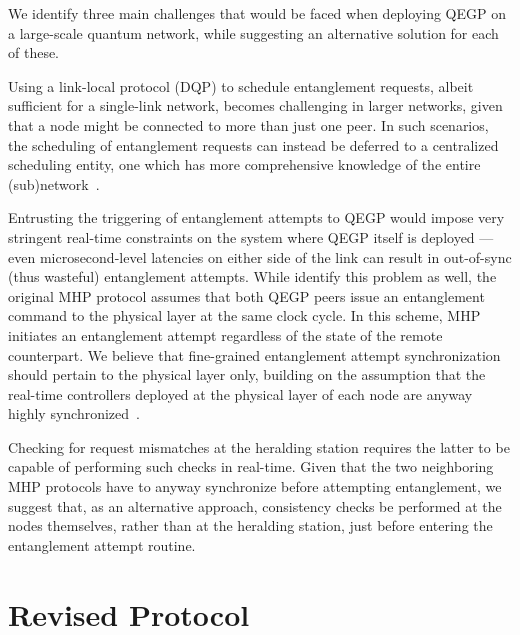 We identify three main challenges that would be faced when deploying QEGP on a large-scale quantum
network, while suggesting an alternative solution for each of these.
%
\begin{enumerate*}[label=(C\arabic*)]
    \item \label{enum:link_ch_queue} Using a link-local protocol (DQP) to schedule entanglement
          requests, albeit sufficient for a single-link network, becomes challenging in larger
          networks, given that a node might be connected to more than just one peer. In such
          scenarios, the scheduling of entanglement requests can instead be deferred to a
          centralized scheduling entity, one which has more comprehensive knowledge of the entire
          (sub)network~\cite{skrzypczyk_2021_arch}.
    \item \label{enum:link_ch_tsync} Entrusting the triggering of entanglement attempts to QEGP
          would impose very stringent real-time constraints on the system where QEGP itself is
          deployed --- even microsecond-level latencies on either side of the link can result in
          out-of-sync (thus wasteful) entanglement attempts. While \textcite{dahlberg_2019_egp}
          identify this problem as well, the original MHP protocol assumes that both QEGP peers
          issue an entanglement command to the physical layer at the same clock cycle. In this
          scheme, MHP initiates an entanglement attempt regardless of the state of the remote
          counterpart. We believe that fine-grained entanglement attempt synchronization should
          pertain to the physical layer only, building on the assumption that the real-time
          controllers deployed at the physical layer of each node are anyway highly
          synchronized~\cite{pompili_2021_multinode}.
    \item \label{enum:link_ch_mismatch} Checking for request mismatches at the heralding station
          requires the latter to be capable of performing such checks in real-time. Given that the
          two neighboring MHP protocols have to anyway synchronize before attempting entanglement,
          we suggest that, as an alternative approach, consistency checks be performed at the nodes
          themselves, rather than at the heralding station, just before entering the entanglement
          attempt routine.
\end{enumerate*}

\section{Revised Protocol}

